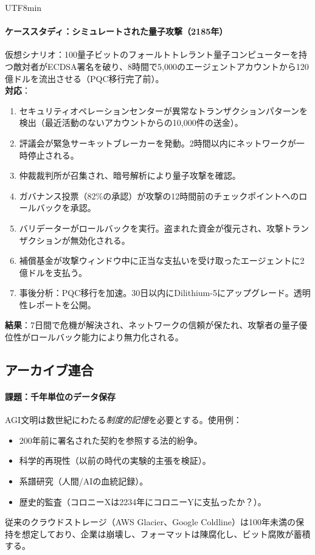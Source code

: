 \documentclass[11pt]{article}
\begin{document}
\begin{CJK}{UTF8}{min}
\paragraph{ケーススタディ：シミュレートされた量子攻撃（2185年）}
仮想シナリオ：100量子ビットのフォールトトレラント量子コンピューターを持つ敵対者がECDSA署名を破り、8時間で5,000のエージェントアカウントから120億ドルを流出させる（PQC移行完了前）。\\
\textbf{対応}：
\begin{enumerate}[noitemsep]
  \item セキュリティオペレーションセンターが異常なトランザクションパターンを検出（最近活動のないアカウントからの10,000件の送金）。
  \item 評議会が緊急サーキットブレーカーを発動。2時間以内にネットワークが一時停止される。
  \item 仲裁裁判所が召集され、暗号解析により量子攻撃を確認。
  \item ガバナンス投票（82\%の承認）が攻撃の12時間前のチェックポイントへのロールバックを承認。
  \item バリデーターがロールバックを実行。盗まれた資金が復元され、攻撃トランザクションが無効化される。
  \item 補償基金が攻撃ウィンドウ中に正当な支払いを受け取ったエージェントに2億ドルを支払う。
  \item 事後分析：PQC移行を加速。30日以内にDilithium-5にアップグレード。透明性レポートを公開。
\end{enumerate}
\textbf{結果}：7日間で危機が解決され、ネットワークの信頼が保たれ、攻撃者の量子優位性がロールバック能力により無力化される。

\subsection{アーカイブ連合}

\paragraph{課題：千年単位のデータ保存}
AGI文明は数世紀にわたる\emph{制度的記憶}を必要とする。使用例：
\begin{itemize}[noitemsep]
  \item 200年前に署名された契約を参照する法的紛争。
  \item 科学的再現性（以前の時代の実験的主張を検証）。
  \item 系譜研究（人間/AIの血統記録）。
  \item 歴史的監査（コロニーXは2234年にコロニーYに支払ったか？）。
\end{itemize}
従来のクラウドストレージ（AWS Glacier、Google Coldline）は100年未満の保持を想定しており、企業は崩壊し、フォーマットは陳腐化し、ビット腐敗が蓄積する。


\end{CJK}
\end{document}
